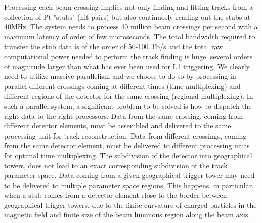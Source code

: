 	Processing each beam crossing implies not only finding and fitting tracks from a collection of Pt "stubs" (hit pairs) but also continuosly reading out the stubs at 40MHz. The system needs to process 40 million beam crossings per second with a maximum latency of order of few microseconds. The total bandwidth required to transfer the stub data is of the order of 50-100 Tb/s and the total raw computational power needed to perform the track finding is huge, several orders of magnitude larger than what has ever been used for L1 triggering. We clearly need to utilize massive parallelism and we choose to do so by processing in parallel different crossings coming at different times (time multiplexing) and different regions of the detector for the same crossing (regional multiplexing). In such a parallel system, a significant problem to be solved is how to dispatch the right data to the right processors. Data from the same crossing, coming from different detector elements, must be assembled and delivered to the same processing unit for track reconstruction. Data from different crossings, coming from the same detector element, must be delivered to different processing units for optimal time multiplexing. The subdivision of the detector into geographical towers, does not lead to an exact corresponding subdivision of the track parameter space. Data coming from a given geographical trigger tower may need to be delivered to multiple parameter space regions. This happens, in particular, when a stub comes from a detector element close to the border between geographical trigger towers, due to the finite curvature of charged particles in the magnetic field and finite size of the beam luminous region along the beam axis. 

